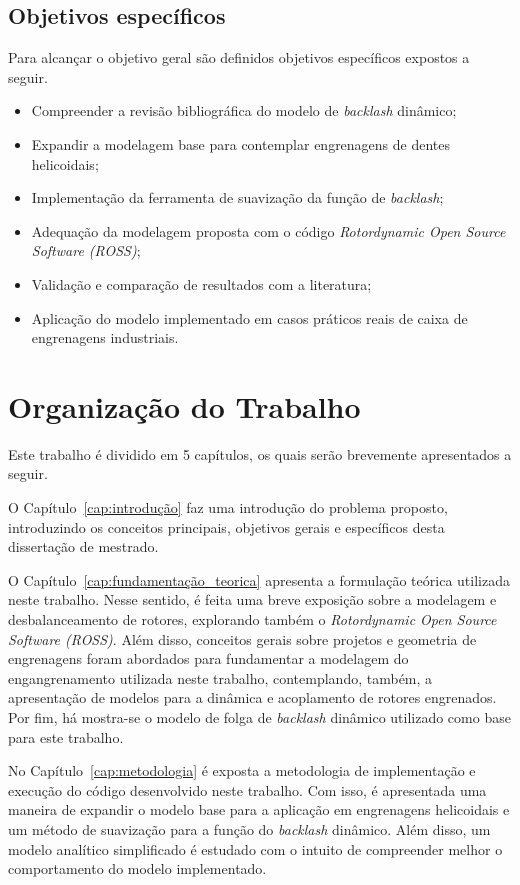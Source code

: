 \subsection{Objetivos específicos}

Para alcançar o objetivo geral são definidos objetivos específicos expostos a seguir.
\begin{itemize}
	\item Compreender a revisão bibliográfica do modelo de \textit{backlash} dinâmico;
	\item Expandir a modelagem base para contemplar engrenagens de dentes helicoidais;
	\item Implementação da ferramenta de suavização da função de \textit{backlash};
	\item Adequação da modelagem proposta com o código \textit{Rotordynamic Open Source Software (ROSS)};
	\item Validação e comparação de resultados com a literatura;
	\item Aplicação do modelo implementado em casos práticos reais de caixa de engrenagens industriais.
\end{itemize} 

\newpage

\section{Organização do Trabalho}

Este trabalho é dividido em 5 capítulos, os quais serão brevemente apresentados a seguir.

O Capítulo~\ref{cap:introdução} faz uma introdução do problema proposto, introduzindo os conceitos principais, objetivos gerais e específicos desta dissertação de mestrado.

O Capítulo~\ref{cap:fundamentação_teorica} apresenta a formulação teórica utilizada neste trabalho. Nesse sentido, é feita uma breve exposição sobre a modelagem e desbalanceamento de rotores, explorando também  o \textit{Rotordynamic Open Source Software (ROSS)}. Além disso, conceitos gerais sobre projetos e geometria de engrenagens foram abordados para fundamentar a modelagem do engangrenamento utilizada neste trabalho, contemplando, também, a apresentação de modelos para a dinâmica e acoplamento de rotores engrenados. Por fim, há mostra-se o modelo de folga de \textit{backlash} dinâmico utilizado como base para este trabalho.

No Capítulo~\ref{cap:metodologia} é exposta a metodologia de implementação e execução do código desenvolvido neste trabalho. Com isso, é apresentada uma maneira de expandir o modelo base para a aplicação em engrenagens helicoidais e um método de suavização para a função do \textit{backlash} dinâmico. Além disso, um modelo analítico simplificado é estudado com o intuito de compreender melhor o comportamento do modelo implementado.

